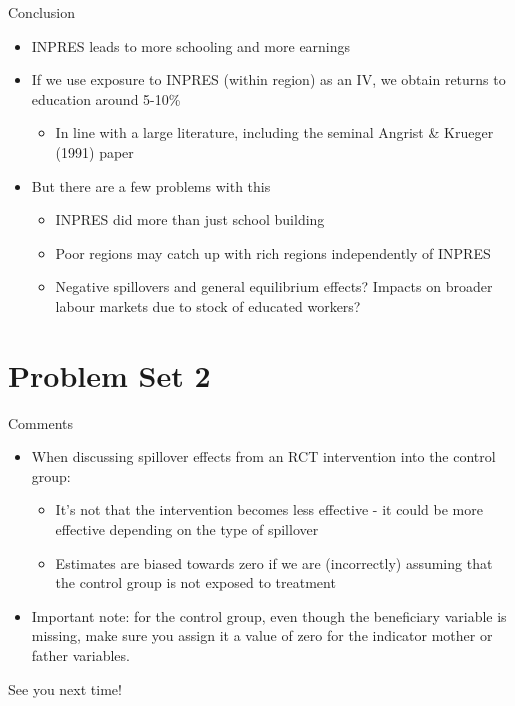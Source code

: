 \documentclass[11pt,notes=hide,aspectratio=169,mathserif]{beamer}
\begin{document}
\begin{frame}{Conclusion}
\begin{itemize}
\item INPRES leads to more schooling and more earnings
 \item If we use exposure to INPRES (within region) as an IV, we obtain returns to education around 5-10\%
\begin{itemize}
     \item In line with a large literature, including the seminal Angrist \& Krueger (1991) paper
\end{itemize}
 \item But there are a few problems with this 
\begin{itemize}
     \item INPRES did more than just school building
     \item Poor regions may catch up with rich regions independently of INPRES
     \item Negative spillovers and general equilibrium effects? Impacts on broader labour markets due to stock of educated workers?
\end{itemize}
\end{itemize}
\end{frame}

\section*{Problem Set 2}

\begin{frame}{Comments}
\begin{itemize}
    \item When discussing spillover effects from an RCT intervention into the control group:
    \begin{itemize}
        \item It's not that the intervention becomes less effective - it could be more effective depending on the type of spillover
        \item Estimates are biased towards zero if we are (incorrectly) assuming that the control group is not exposed to treatment
    \end{itemize}
    \item Important note: for the control group, even though the beneficiary variable is missing, make sure you assign it a value of zero for the indicator mother or father variables. 
\end{itemize}
\end{frame}




\begin{frame}
\begin{center}{\LARGE See you next time!}\end{center}
\end{frame}
\end{document}
